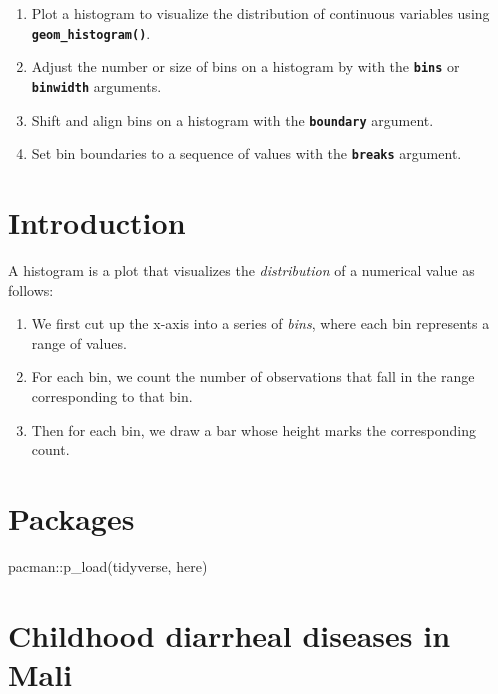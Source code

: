 \documentclass[
  letterpaper,
  DIV=11,
  numbers=noendperiod]{scrreprt}
\newenvironment{Shaded}{\begin{snugshade}}{\end{snugshade}}
\newcommand{\FunctionTok}[1]{\textcolor[rgb]{0.28,0.35,0.67}{#1}}
\newcommand{\NormalTok}[1]{\textcolor[rgb]{0.00,0.23,0.31}{#1}}
\newcommand{\SpecialCharTok}[1]{\textcolor[rgb]{0.37,0.37,0.37}{#1}}
\providecommand{\tightlist}{%
  \setlength{\itemsep}{0pt}\setlength{\parskip}{0pt}}\usepackage{longtable,booktabs,array}
\begin{document}
\begin{enumerate}
\def\labelenumi{\arabic{enumi}.}
\tightlist
\item
  Plot a histogram to visualize the distribution of continuous variables
  using \textbf{\texttt{geom\_histogram()}}.
\item
  Adjust the number or size of bins on a histogram by with the
  \textbf{\texttt{bins}} or \textbf{\texttt{binwidth}} arguments.
\item
  Shift and align bins on a histogram with the
  \textbf{\texttt{boundary}} argument.
\item
  Set bin boundaries to a sequence of values with the
  \textbf{\texttt{breaks}} argument.
\end{enumerate}

\hypertarget{introduction-3}{%
\section{Introduction}\label{introduction-3}}

A histogram is a plot that visualizes the \emph{distribution} of a
numerical value as follows:

\begin{enumerate}
\def\labelenumi{\arabic{enumi}.}
\item
  We first cut up the x-axis into a series of \emph{bins}, where each
  bin represents a range of values.
\item
  For each bin, we count the number of observations that fall in the
  range corresponding to that bin.
\item
  Then for each bin, we draw a bar whose height marks the corresponding
  count.
\end{enumerate}

\hypertarget{packages-2}{%
\section{Packages}\label{packages-2}}

\begin{Shaded}
\begin{Highlighting}[]
\NormalTok{pacman}\SpecialCharTok{::}\FunctionTok{p\_load}\NormalTok{(tidyverse,}
\NormalTok{               here)}
\end{Highlighting}
\end{Shaded}

\hypertarget{childhood-diarrheal-diseases-in-mali-1}{%
\section{Childhood diarrheal diseases in
Mali}\label{childhood-diarrheal-diseases-in-mali-1}}
\end{document}
